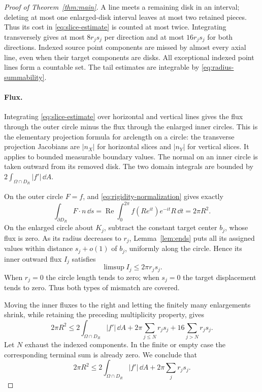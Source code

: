 \begin{proof}[Proof of Theorem~\ref{thm:main}]
A line meets a remaining disk in an interval; deleting at most one
enlarged-disk interval leaves at most two retained pieces.  Thus its
cost in \eqref{eq:slice-estimate} is counted at most twice.  Integrating
transversely gives at most $8r_js_j$ per direction and at most
$16r_js_j$ for both directions.  Indexed source point components are
missed by almost every axial line, even when their target components
are disks.  All exceptional indexed point lines form a countable set.
The tail estimates are integrable by \eqref{eq:radius-summability}.

\paragraph{Flux.}
Integrating \eqref{eq:slice-estimate} over horizontal and vertical
lines gives the flux through the outer circle minus the flux through
the enlarged inner circles.  This is the elementary projection
formula for arclength on a circle: the transverse projection Jacobians
are $|n_X|$ for horizontal slices and $|n_Y|$ for vertical slices.
It applies to bounded measurable boundary values.  The normal on an inner circle is taken outward
from its removed disk.  The two domain integrals are bounded by
$2\int_{\Omega\cap D_R}|f'|\,\dd A$.

On the outer circle $F=f$, and
\eqref{eq:rigidity-normalization} gives exactly
\begin{equation}\label{eq:outer-flux}
 \int_{\partial D_R}F\cdot n\,\dd s
 =\operatorname{Re}\int_0^{2\pi}
     f(Re^{it})e^{-it}R\,\dd t
 =2\pi R^2.
\end{equation}
On the enlarged circle about $K_j$, subtract the constant target
center $b_j$, whose flux is zero.  As its radius decreases to $r_j$,
Lemma~\ref{lem:ends} puts all its assigned values within distance
$s_j+o(1)$ of $b_j$, uniformly along the circle.  Hence its inner
outward flux $I_j$ satisfies
\begin{equation}\label{eq:inner-flux}
 \limsup I_j\le2\pi r_js_j.
\end{equation}
When $r_j=0$ the circle length tends to zero; when $s_j=0$ the target
displacement tends to zero.  Thus both types of mismatch are covered.

Moving the inner fluxes to the right and letting the finitely many
enlargements shrink, while retaining the preceding multiplicity
property, gives
\[
 2\pi R^2
 \le 2\int_{\Omega\cap D_R}|f'|\,\dd A
    +2\pi\sum_{j\le N}r_js_j
    +16\sum_{j>N}r_js_j.
\]
Let $N$ exhaust the indexed components.  In the finite or empty case
the corresponding terminal sum is already zero.  We conclude that
\begin{equation}\label{eq:limiting-flux}
 2\pi R^2\le2\int_{\Omega\cap D_R}|f'|\,\dd A
                      +2\pi\sum_jr_js_j.
\end{equation}


\end{proof}
